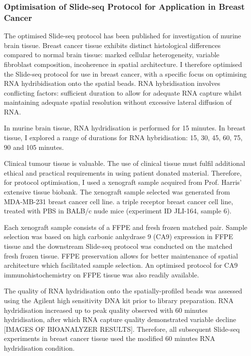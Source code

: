\subsubsection{Optimisation of Slide-seq Protocol for Application in Breast Cancer}
The optimised Slide-seq protocol has been published for investigation of murine brain tissue. Breast cancer tissue exhibits distinct histological differences compared to normal brain tissue: marked cellular heterogeneity, variable fibroblast composition, incoherence in spatial architecture. I therefore optimised the Slide-seq protocol for use in breast cancer, with a specific focus on optimising RNA hydribidisation onto the spatial beads. RNA hybridisation involves conflicting factors: sufficient duration to allow for adequate RNA capture whilst maintaining adequate spatial resolution without excessive lateral diffusion of RNA.

In murine brain tissue, RNA hydridisation is performed for 15 minutes. In breast tissue, I explored a range of durations for RNA hybridisation: 15, 30, 45, 60, 75, 90 and 105 minutes.

Clinical tumour tissue is valuable. The use of clinical tissue must fulfil additional ethical and practical requirements in using patient donated material. Therefore, for protocol optimisation, I used a xenograft sample acquired from Prof. Harris' extensive tissue biobank. The xenograft sample selected was generated from MDA-MB-231 breast cancer cell line. a triple receptor breast cancer cell line, treated with PBS in BALB/c nude mice (experiment ID JLI-164, sample 6).

Each xenograft sample consists of a FFPE and fresh frozen matched pair. Sample selection was based on high carbonic anhydrase 9 (CA9) expression in FFPE tissue and the downstream Slide-seq protocol was conducted on the matched fresh frozen tissue. FFPE preservation allows for better maintenance of spatial architecture which facilitated sample selection. An optimised protocol for CA9 immunohistochemistry on FFPE tissue was also readily available.

The quality of RNA hydridisation onto the spatially-profiled beads was assessed using the Agilent high sensitivity DNA kit prior to library preparation. RNA hydridisation increased up to peak quality observed with 60 minutes hydridisation, after which RNA capture quality demonstrated variable decline [IMAGES OF BIOANALYZER RESULTS]. Therefore, all subsequent Slide-seq experiments in breast cancer tissue used the modified 60 minutes RNA hydridisation condition.

